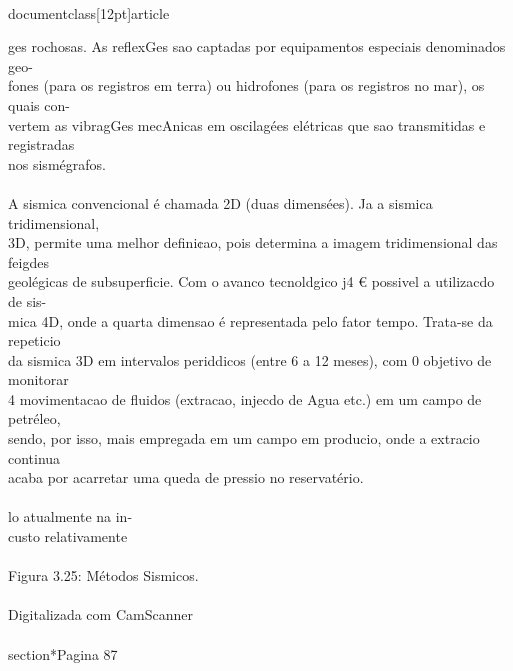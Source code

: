 \\documentclass[12pt]{article}
\begin{document}
{ges rochosas. As reflexGes sao captadas por equipamentos especiais denominados geo-\\
fones (para os registros em terra) ou hidrofones (para os registros no mar), os quais con-\\
vertem as vibragGes mecAnicas em oscilagées elétricas que sao transmitidas e registradas\\
nos sismégrafos.\\
\\
A sismica convencional é chamada 2D (duas dimensées). Ja a sismica tridimensional,\\
3D, permite uma melhor defini¢ao, pois determina a imagem tridimensional das feigdes\\
geolégicas de subsuperficie. Com o avanco tecnoldgico j4 € possivel a utilizacdo de sis-\\
mica 4D, onde a quarta dimensao é representada pelo fator tempo. Trata-se da repeticio\\
da sismica 3D em intervalos periddicos (entre 6 a 12 meses), com 0 objetivo de monitorar\\
4 movimentacao de fluidos (extracao, injecdo de Agua etc.) em um campo de petréleo,\\
sendo, por isso, mais empregada em um campo em producio, onde a extracio continua\\
acaba por acarretar uma queda de pressio no reservatério.\\
\\
lo atualmente na in-\\
custo relativamente\\
\\
Figura 3.25: Métodos Sismicos.\\
\\
Digitalizada com CamScanner\\

\\section*{Pagina 87}

}
\end{document}
